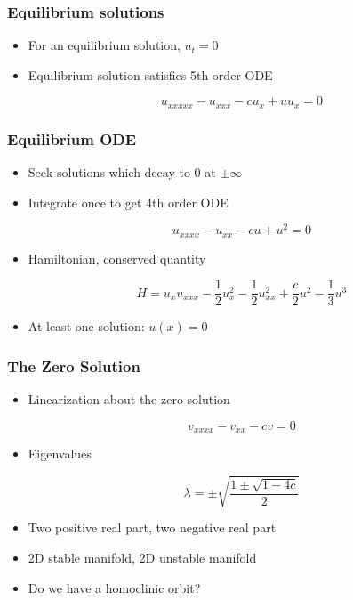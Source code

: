 \documentclass[16pt]{beamer}
\begin{document}
\begin{frame}
	\frametitle{Equilibrium solutions}
	\fontsize{18}{7.2}\selectfont
	\begin{itemize}
		\item<1-> For an equilibrium solution, $u_t = 0$

		\vspace{0.5cm}
		\item<2-> Equilibrium solution satisfies 5th order ODE 
		\begin{center}
		\[ u_{xxxxx} - u_{xxx} - c u_x + u u_x = 0 \]
		\end{center}
	\end{itemize}
\end{frame}

\begin{frame}
	\frametitle{Equilibrium ODE}
	\fontsize{16}{7.2}\selectfont
	\begin{itemize}
		\item<1->Seek solutions which decay to 0 at $\pm \infty$
		\vspace{0.5cm}
		\item<2->Integrate once to get 4th order ODE 
		\begin{center}
		\[u_{xxxx} - u_{xx} - cu + u^2 = 0\]
		\end{center}
		\vspace{0.5cm}
		\item<4->Hamiltonian, conserved quantity
		\begin{center}
		\[
		H = u_x u_{xxx} - \frac{1}{2}u_x^2 - \frac{1}{2}u_{xx}^2 + \frac{c}{2}u^2 - \frac{1}{3}u^3
		\]
		\end{center}
		\item<4->At least one solution: $u(x) = 0$
	\end{itemize} 
\end{frame}

\begin{frame}
	\frametitle{The Zero Solution}
	\fontsize{16}{7.2}\selectfont
	\begin{itemize}
		\item<1->Linearization about the zero solution
		\begin{center}
		\[v_{xxxx} - v_{xx} - c v = 0 \]
		\end{center}
		\item<2->Eigenvalues
		\begin{center}
		\[ \lambda = \pm \sqrt{ \frac{1 \pm \sqrt{1 - 4c } }{ 2} } \]
		\end{center}
		\item<3->Two positive real part, two negative real part
		\item<4->2D stable manifold, 2D unstable manifold
		\item<5->Do we have a homoclinic orbit?
	\end{itemize}
\end{frame}
\end{document}
